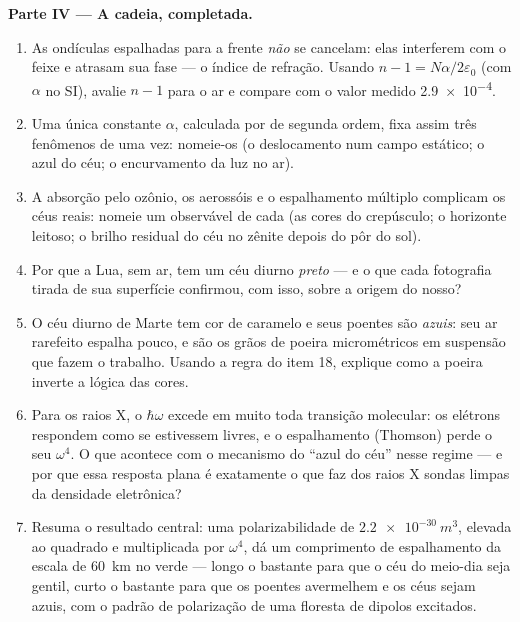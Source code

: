 \begin{problem}
\medskip\noindent\textbf{Parte IV --- A cadeia, completada.}
\begin{enumerate}[resume]
  \item As ondículas espalhadas para a frente \emph{não} se cancelam:
        elas interferem com o feixe e atrasam sua fase --- o índice de
        refração. Usando $n - 1 = N\alpha/2\varepsilon_0$
        (com $\alpha$ no SI), avalie $n - 1$ para o ar e compare com o
        valor medido \num{2.9e-4}.
  \item Uma única constante $\alpha$, calculada por  de segunda ordem, fixa assim três fenômenos de uma
        vez: nomeie-os (o deslocamento num campo estático; o azul do
        céu; o encurvamento da luz no ar).
  \item A absorção pelo ozônio, os aerossóis e o espalhamento múltiplo
        complicam os céus reais: nomeie um observável de cada (as cores
        do crepúsculo; o horizonte leitoso; o brilho residual do céu no
        zênite depois do pôr do sol).
  \item Por que a Lua, sem ar, tem um céu diurno \emph{preto} --- e o
        que cada fotografia tirada de sua superfície confirmou, com
        isso, sobre a origem do nosso?
  \item O céu diurno de Marte tem cor de caramelo e seus poentes são
        \emph{azuis}: seu ar rarefeito espalha pouco, e são os grãos de
        poeira micrométricos em suspensão que fazem o trabalho. Usando
        a regra do item 18, explique como a poeira inverte a lógica das
        cores.
  \item Para os raios X, o $\hbar\omega$ excede em muito toda transição
        molecular: os elétrons respondem como se estivessem livres, e o
        espalhamento (Thomson) perde o seu $\omega^4$. O que acontece
        com o mecanismo do ``azul do céu'' nesse regime --- e por que
        essa resposta plana é exatamente o que faz dos raios X sondas
        limpas da densidade eletrônica?
  \item Resuma o resultado central: uma polarizabilidade de
        $\qty{2.2e-30}{m^3}$, elevada ao quadrado e multiplicada por
        $\omega^4$, dá um comprimento de espalhamento da escala de
        \qty{60}{km} no verde --- longo o bastante para que o céu do
        meio-dia seja gentil, curto o bastante para que os poentes
        avermelhem e os céus sejam azuis, com o padrão de polarização
        de uma floresta de dipolos excitados.
\end{enumerate}
\end{problem}

